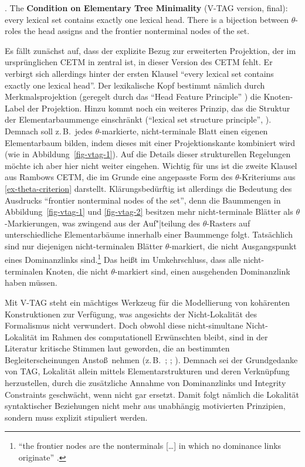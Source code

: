 \ex. The {\bf Condition on Elementary Tree Minimality} (V-TAG version, final): every lexical set contains exactly one lexical head. There is a bijection between $\theta$-roles the head assigns and the frontier nonterminal nodes of the set. \citep[149]{Rambow:94} \label{ex-vtag-cetm}

Es fällt zunächst auf, dass der explizite Bezug zur erweiterten Projektion, der im ursprünglichen CETM in \cite{Frank:92,Frank:02} zentral ist, in dieser Version des CETM fehlt. Er verbirgt sich allerdings hinter der ersten Klausel "`every lexical set contains exactly one lexical head"'. Der lexikalische Kopf bestimmt nämlich durch Merkmalsprojektion (geregelt durch das "`Head Feature Principle"' \citealt[141f]{Rambow:94}) die Knoten-Label der Projektion. Hinzu kommt noch ein weiteres Prinzip, das die Struktur der Elementarbaummenge einschränkt ("`lexical set structure principle"', \citealt[149]{Rambow:94}). Demnach soll z.\,B.\ jedes $\theta$-markierte, nicht-terminale Blatt einen eigenen Elementarbaum bilden, indem dieses mit einer Projektionskante kombiniert wird (wie in Abbildung~\ref{fig-vtag-1}). Auf die Details dieser strukturellen Regelungen möchte ich aber hier nicht weiter eingehen. Wichtig für uns ist die zweite Klausel aus Rambows CETM, die im Grunde eine angepasste Form des $\theta$-Kriteriums aus \ref{ex-theta-criterion} darstellt. Klärungsbedürftig ist allerdings die Bedeutung des Ausdrucks "`frontier nonterminal nodes of the set"', denn die Baummengen in Abbildung~\ref{fig-vtag-1} und \ref{fig-vtag-2} besitzen mehr nicht-terminale Blätter als $\theta$-Markierungen, was zwingend aus der Auf"|teilung des $\theta$-Rasters auf unterschiedliche Elementarbäume innerhalb einer Baummenge folgt. Tatsächlich sind nur diejenigen nicht-terminalen Blätter $\theta$-markiert, die nicht Ausgangspunkt eines Dominanzlinks sind.\footnote{"`the frontier nodes are the nonterminals [\ldots] in which no dominance links originate"' \citep[148, Fußnote~14]{Rambow:94}.} Das hei\ss t im Umkehrschluss, dass alle nicht-terminalen Knoten, die nicht $\theta$-markiert sind, einen ausgehenden Dominanzlink haben müssen.  

Mit V-TAG steht ein mächtiges Werkzeug für die Modellierung von kohärenten Konstruktionen zur Verfügung, was angesichts der Nicht-Lokalität des Formalismus nicht verwundert. Doch obwohl diese nicht-simultane Nicht-Lokalität im Rahmen des computationell Erwünschten bleibt, sind in der Literatur kritische Stimmen laut geworden, die an bestimmten Begleiterscheinungen Ansto\ss \ nehmen (z.\,B.\ \citealt[60]{Kulick:00}; \citealt[239]{Frank:02}; \citealt[191]{Kallmeyer:05}). Demnach sei der Grundgedanke von TAG, Lokalität allein mittels Elementarstrukturen und deren Verknüpfung herzustellen, durch die zusätzliche Annahme von Dominanzlinks und Integrity Constraints geschwächt, wenn nicht gar ersetzt. Damit folgt nämlich die Lokalität syntaktischer Beziehungen nicht mehr aus unabhängig motivierten Prinzipien, sondern muss explizit stipuliert werden.


